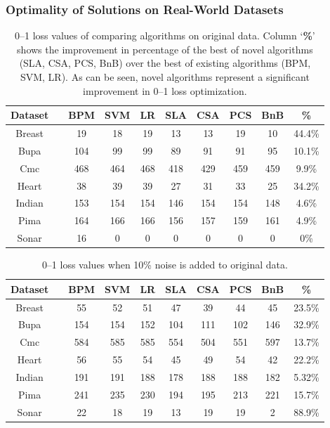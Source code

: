 \subsubsection{Optimality of Solutions on Real-World Datasets}
\label{ssec:rc.optimality2}

\begin{table}[htbp!]
\centering
\begin{tabular}{|cc|  ccc|cccc|c|}
\hline\hline
{\bf Dataset} && {\bf BPM} & {\bf SVM} & {\bf LR} & {\bf SLA} & {\bf CSA} & {\bf PCS} & {\bf BnB} & {\bf \% }\\ 
\hline 
Breast	&& 19 & 18 & 19 & 13 		& 13 & 19 & 10 & 44.4\%\\  
Bupa		&& 104 & 99 & 99 & 89 		& 91 & 91 & 95 & 10.1\%\\   
Cmc		&& 468 & 464 & 468 & 418 	& 429 & 459 & 459 & 9.9\%\\   
Heart  	&& 38 & 39 & 39 & 27 		& 31 & 33 & 25 & 34.2\%\\  
Indian  	&& 153 & 154 & 154 & 146 	& 154 & 154 & 148 & 4.6\%\\    
Pima 	&& 164 & 166 & 166 & 156 	& 157 & 159 & 161 & 4.9\%\\    
Sonar  	&& 16 & 0 & 0 & 0 			& 0 & 0 & 0 & 0\%\\ 
\hline\hline
\end{tabular}
\caption{0--1 loss values of comparing algorithms on original
  data. Column `{\bf \%}' shows the improvement in percentage of the
  best of novel algorithms (SLA, CSA, PCS, BnB) over the best of
  existing algorithms (BPM, SVM, LR). As can be seen, novel algorithms
  represent a significant improvement in 0--1 loss optimization.}
\label{tab:losses0noise}
\end{table}

\begin{table}[htbp!]
\centering
\begin{tabular}{|cc|  ccc|cccc|c|}
\hline\hline
{\bf Dataset} && {\bf BPM} & {\bf SVM} & {\bf LR} & {\bf SLA} & {\bf CSA} & {\bf PCS} & {\bf BnB} & {\bf \% }\\
\hline
Breast 	&& 55 & 52 & 51 & 47 		& 39 & 44 & 45 & 23.5\%\\  
Bupa 	&& 154 & 154 & 152 & 104 	& 111 & 102 & 146 & 32.9\%\\   
Cmc 		&& 584 & 585 & 585 & 554 	& 504 & 551 & 597 & 13.7\%\\   
Heart 	&& 56 & 55 & 54 & 45 		& 49 & 54 & 42 & 22.2\%\\  
Indian 	&& 191 & 191 & 188 & 178 	& 188 & 188 & 182 & 5.32\%\\    
Pima 	&& 241 & 235 & 230 & 194 	& 195 & 213 & 221 & 15.7\%\\    
Sonar 	&& 22 & 18 & 19 & 13 		& 19 & 19 & 2 & 88.9\%\\ 
\hline\hline
\end{tabular}
\caption{0--1 loss values when 10\% noise is added to original data.}
\label{tab:losses1noise}
\end{table}

